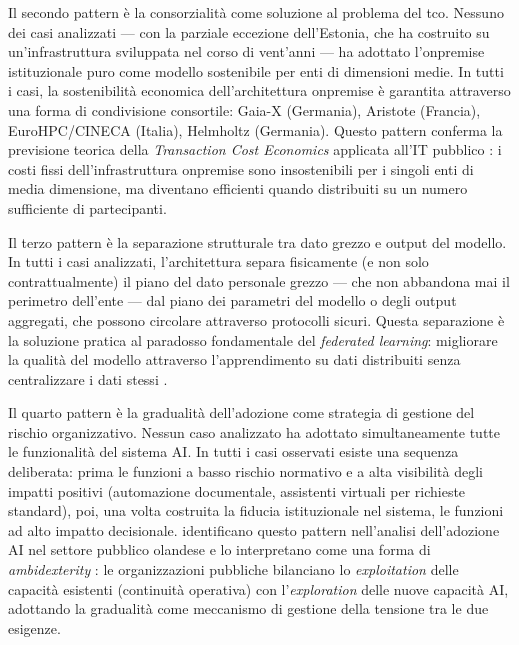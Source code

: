 Il secondo pattern è la consorzialità come soluzione al problema
del \gls{tco}. Nessuno dei casi analizzati --- con la parziale eccezione dell'Estonia,
che ha costruito su un'infrastruttura sviluppata nel corso di vent'anni ---
ha adottato l'\gls{onpremise} istituzionale puro come modello sostenibile
per enti di dimensioni medie. In tutti i casi, la sostenibilità economica
dell'architettura \gls{onpremise} è garantita attraverso una forma di
condivisione consortile: Gaia-X (Germania), Aristote (Francia), EuroHPC/CINECA
(Italia), Helmholtz (Germania). Questo pattern conferma la previsione teorica
della \textit{Transaction Cost Economics} \parencite{Williamson1985} applicata
all'IT pubblico \parencite{Aubert2004}: i costi fissi dell'infrastruttura
\gls{onpremise} sono insostenibili per i singoli enti di media dimensione,
ma diventano efficienti quando distribuiti su un numero sufficiente di partecipanti.

Il terzo pattern è la separazione strutturale tra dato grezzo e
output del modello. In tutti i casi analizzati, l'architettura separa fisicamente
(e non solo contrattualmente) il piano del dato personale grezzo --- che non
abbandona mai il perimetro dell'ente --- dal piano dei parametri del modello o
degli output aggregati, che possono circolare attraverso protocolli sicuri.
Questa separazione è la soluzione pratica al paradosso fondamentale del
\textit{federated learning}: migliorare la qualità del modello attraverso
l'apprendimento su dati distribuiti senza centralizzare i dati stessi
\parencite{LiLaiWang2023,GadekalluFL2026}.

Il quarto pattern è la gradualità dell'adozione come strategia
di gestione del rischio organizzativo. Nessun caso analizzato ha adottato
simultaneamente tutte le funzionalità del sistema AI. In tutti i casi osservati
esiste una sequenza deliberata: prima le funzioni a basso rischio normativo
e a alta visibilità degli impatti positivi (automazione documentale, assistenti
virtuali per richieste standard), poi, una volta costruita la fiducia istituzionale
nel sistema, le funzioni ad alto impatto decisionale. \textcite{Selten2024}
identificano questo pattern nell'analisi dell'adozione AI nel settore pubblico
olandese e lo interpretano come una forma di \textit{ambidexterity}
\parencite{OReillyTushman2013}: le organizzazioni pubbliche bilanciano lo
\textit{exploitation} delle capacità esistenti (continuità operativa) con
l'\textit{exploration} delle nuove capacità AI, adottando la gradualità come
meccanismo di gestione della tensione tra le due esigenze.

